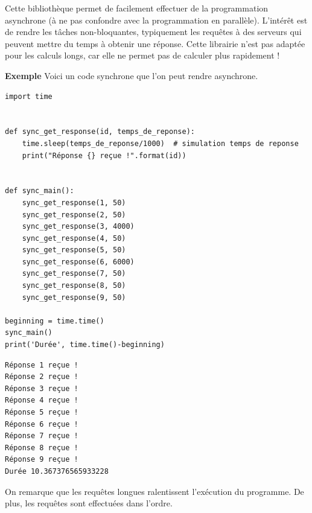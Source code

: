 \documentclass[a4paper, 10pt]{article}
\begin{document}
Cette bibliothèque permet de facilement effectuer de la programmation asynchrone (à ne pas confondre avec la programmation en parallèle). L'intérêt est de rendre les tâches non-bloquantes, typiquement les requêtes à des serveurs qui peuvent mettre du temps à obtenir une réponse. Cette librairie n'est pas adaptée pour les calculs longs, car elle ne permet pas de calculer plus rapidement !\bigskip

\textbf{Exemple} Voici un code synchrone que l'on peut rendre asynchrone.
\begin{verbatim}
import time


def sync_get_response(id, temps_de_reponse):
    time.sleep(temps_de_reponse/1000)  # simulation temps de reponse
    print("Réponse {} reçue !".format(id))


def sync_main():
    sync_get_response(1, 50)
    sync_get_response(2, 50)
    sync_get_response(3, 4000)
    sync_get_response(4, 50)
    sync_get_response(5, 50)
    sync_get_response(6, 6000)
    sync_get_response(7, 50)
    sync_get_response(8, 50)
    sync_get_response(9, 50)

beginning = time.time()
sync_main()
print('Durée', time.time()-beginning)
\end{verbatim}

\begin{verbatim}
Réponse 1 reçue !
Réponse 2 reçue !
Réponse 3 reçue !
Réponse 4 reçue !
Réponse 5 reçue !
Réponse 6 reçue !
Réponse 7 reçue !
Réponse 8 reçue !
Réponse 9 reçue !
Durée 10.367376565933228
\end{verbatim}
On remarque que les requêtes longues ralentissent l'exécution du programme. De plus, les requêtes sont effectuées dans l'ordre.
\end{document}

